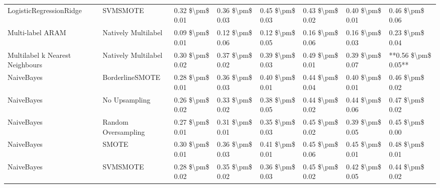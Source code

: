 \begin{tabular}{llllllll}
        LogisticRegressionRidge &                      SVMSMOTE & 0.32 \$\textbackslash pm\$ 0.01 &           0.36 \$\textbackslash pm\$ 0.03 &       0.45 \$\textbackslash pm\$ 0.03 &        0.43 \$\textbackslash pm\$ 0.02 &                         0.40 \$\textbackslash pm\$ 0.01 &     0.46 \$\textbackslash pm\$ 0.06 \\
               Multi-label ARAM &           Natively Multilabel & 0.09 \$\textbackslash pm\$ 0.01 &           0.12 \$\textbackslash pm\$ 0.06 &       0.12 \$\textbackslash pm\$ 0.05 &        0.16 \$\textbackslash pm\$ 0.06 &                         0.16 \$\textbackslash pm\$ 0.03 &     0.23 \$\textbackslash pm\$ 0.04 \\
Multilabel k Nearest Neighbours &           Natively Multilabel & 0.30 \$\textbackslash pm\$ 0.02 &           0.37 \$\textbackslash pm\$ 0.02 &       0.39 \$\textbackslash pm\$ 0.03 &        0.49 \$\textbackslash pm\$ 0.01 &                         0.39 \$\textbackslash pm\$ 0.07 & **0.56 \$\textbackslash pm\$ 0.05** \\
                     NaiveBayes &               BorderlineSMOTE & 0.28 \$\textbackslash pm\$ 0.01 &           0.36 \$\textbackslash pm\$ 0.03 &       0.40 \$\textbackslash pm\$ 0.01 &        0.44 \$\textbackslash pm\$ 0.04 &                         0.40 \$\textbackslash pm\$ 0.01 &     0.46 \$\textbackslash pm\$ 0.02 \\
                     NaiveBayes &                 No Upsampling & 0.26 \$\textbackslash pm\$ 0.02 &           0.33 \$\textbackslash pm\$ 0.02 &       0.38 \$\textbackslash pm\$ 0.05 &        0.44 \$\textbackslash pm\$ 0.02 &                         0.44 \$\textbackslash pm\$ 0.06 &     0.47 \$\textbackslash pm\$ 0.02 \\
                     NaiveBayes &           Random Oversampling & 0.27 \$\textbackslash pm\$ 0.01 &           0.31 \$\textbackslash pm\$ 0.01 &       0.35 \$\textbackslash pm\$ 0.03 &        0.45 \$\textbackslash pm\$ 0.02 &                         0.39 \$\textbackslash pm\$ 0.05 &     0.45 \$\textbackslash pm\$ 0.00 \\
                     NaiveBayes &                         SMOTE & 0.30 \$\textbackslash pm\$ 0.01 &           0.36 \$\textbackslash pm\$ 0.03 &       0.41 \$\textbackslash pm\$ 0.01 &        0.45 \$\textbackslash pm\$ 0.06 &                         0.45 \$\textbackslash pm\$ 0.01 &     0.48 \$\textbackslash pm\$ 0.01 \\
                     NaiveBayes &                      SVMSMOTE & 0.28 \$\textbackslash pm\$ 0.02 &           0.35 \$\textbackslash pm\$ 0.02 &       0.36 \$\textbackslash pm\$ 0.03 &        0.45 \$\textbackslash pm\$ 0.02 &                         0.42 \$\textbackslash pm\$ 0.05 &     0.44 \$\textbackslash pm\$ 0.02 \\

\end{tabular}

